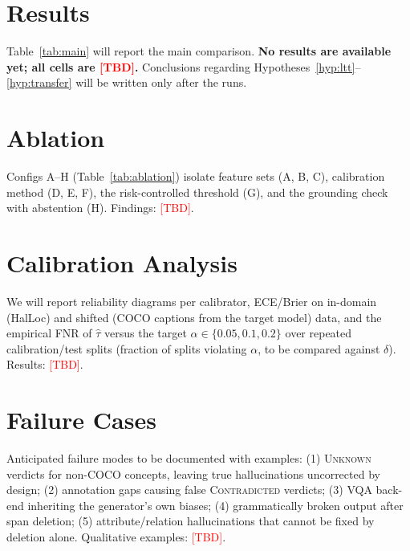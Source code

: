 \documentclass[11pt]{article}
\newcommand{\TBD}{\textcolor{red}{[TBD]}}
\begin{document}
\section{Results}
\label{sec:results}
Table~\ref{tab:main} will report the main comparison. \textbf{No results are available yet; all cells are \TBD.} Conclusions regarding Hypotheses~\ref{hyp:ltt}--\ref{hyp:transfer} will be written only after the runs.



\section{Ablation}
\label{sec:ablation}
Configs A--H (Table~\ref{tab:ablation}) isolate feature sets (A, B, C), calibration method (D, E, F), the risk-controlled threshold (G), and the grounding check with abstention (H). Findings: \TBD.



\section{Calibration Analysis}
\label{sec:calibration}
We will report reliability diagrams per calibrator, ECE/Brier on in-domain (HalLoc) and shifted (COCO captions from the target model) data, and the empirical FNR of $\hat\tau$ versus the target $\alpha \in \{0.05, 0.1, 0.2\}$ over repeated calibration/test splits (fraction of splits violating $\alpha$, to be compared against $\delta$). Results: \TBD.

\section{Failure Cases}
\label{sec:failures}
Anticipated failure modes to be documented with examples: (1) \textsc{Unknown} verdicts for non-COCO concepts, leaving true hallucinations uncorrected by design; (2) annotation gaps causing false \textsc{Contradicted} verdicts; (3) VQA back-end inheriting the generator's own biases; (4) grammatically broken output after span deletion; (5) attribute/relation hallucinations that cannot be fixed by deletion alone. Qualitative examples: \TBD.
\end{document}
